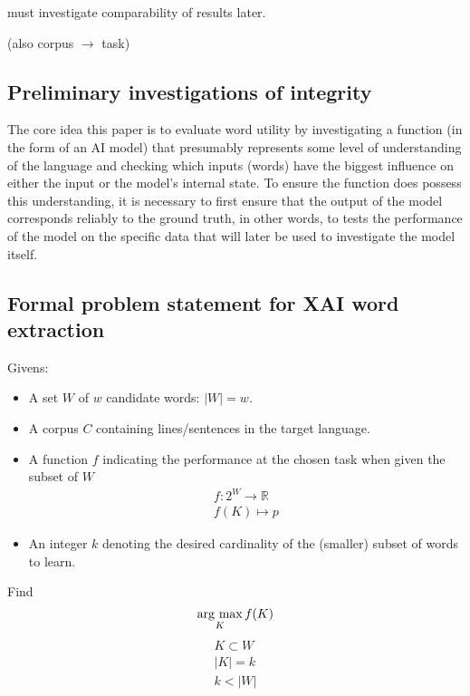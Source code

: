 must investigate comparability of results later.

(also corpus $\rightarrow$ task)
\subsection{Preliminary investigations of integrity}
The core idea this paper is to evaluate word utility by investigating a function (in the form of an AI model) that presumably represents some level of understanding of the language and checking which inputs (words) have the biggest influence on either the input or the model's internal state.
To ensure the function does possess this understanding, it is necessary to first ensure that the output of the model corresponds reliably to the ground truth, in other words, to tests the performance of the model on the specific data that will later be used to investigate the model itself.



\subsection{Formal problem statement for XAI word extraction}

Givens:

\begin{itemize}
	\item A set $W$ of $w$ candidate words: $|W| = w$.

	\item A corpus $C$ containing lines/sentences in the target language.

	\item A function $f$ indicating the performance at the chosen task when given the subset of $W$
	      \begin{align*}f : 2^{W} \to \mathbb{R} \\
		      f (K) \mapsto p
	      \end{align*}

	\item An integer $k$ denoting the desired cardinality of the (smaller) subset of words to learn.
\end{itemize}
Find
\[
	\mathop{\rm arg~max}\limits_{K} f(K)
\]
\begin{align*}
	K \subset W \\
	|K| = k     \\
	k < |W|
\end{align*}

